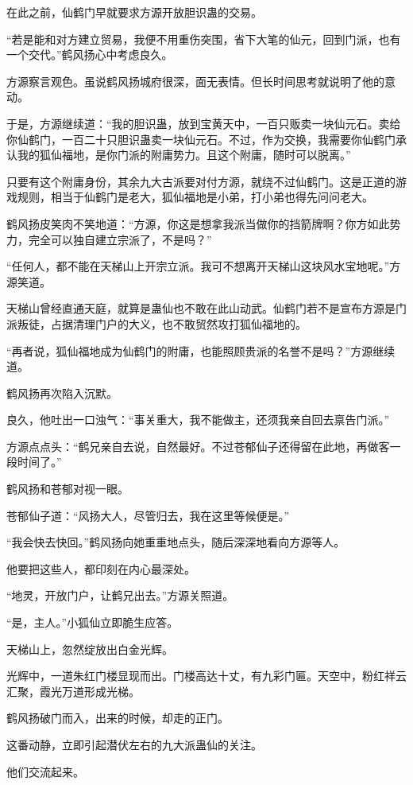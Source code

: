 \begin{this_body}
在此之前，仙鹤门早就要求方源开放胆识蛊的交易。

“若是能和对方建立贸易，我便不用重伤突围，省下大笔的仙元，回到门派，也有一个交代。”鹤风扬心中考虑良久。

方源察言观色。虽说鹤风扬城府很深，面无表情。但长时间思考就说明了他的意动。

于是，方源继续道：“我的胆识蛊，放到宝黄天中，一百只贩卖一块仙元石。卖给你仙鹤门，一百二十只胆识蛊卖一块仙元石。不过，作为交换，我需要你仙鹤门承认我的狐仙福地，是你门派的附庸势力。且这个附庸，随时可以脱离。”

只要有这个附庸身份，其余九大古派要对付方源，就绕不过仙鹤门。这是正道的游戏规则，相当于仙鹤门是老大，狐仙福地是小弟，打小弟也得先问问老大。

鹤风扬皮笑肉不笑地道：“方源，你这是想拿我派当做你的挡箭牌啊？你方如此势力，完全可以独自建立宗派了，不是吗？”

“任何人，都不能在天梯山上开宗立派。我可不想离开天梯山这块风水宝地呢。”方源笑道。

天梯山曾经直通天庭，就算是蛊仙也不敢在此山动武。仙鹤门若不是宣布方源是门派叛徒，占据清理门户的大义，也不敢贸然攻打狐仙福地的。

“再者说，狐仙福地成为仙鹤门的附庸，也能照顾贵派的名誉不是吗？”方源继续道。

鹤风扬再次陷入沉默。

良久，他吐出一口浊气：“事关重大，我不能做主，还须我亲自回去禀告门派。”

方源点点头：“鹤兄亲自去说，自然最好。不过苍郁仙子还得留在此地，再做客一段时间了。”

鹤风扬和苍郁对视一眼。

苍郁仙子道：“风扬大人，尽管归去，我在这里等候便是。”

“我会快去快回。”鹤风扬向她重重地点头，随后深深地看向方源等人。

他要把这些人，都印刻在内心最深处。

“地灵，开放门户，让鹤兄出去。”方源关照道。

“是，主人。”小狐仙立即脆生应答。

天梯山上，忽然绽放出白金光辉。

光辉中，一道朱红门楼显现而出。门楼高达十丈，有九彩门匾。天空中，粉红祥云汇聚，霞光万道形成光梯。

鹤风扬破门而入，出来的时候，却走的正门。

这番动静，立即引起潜伏左右的九大派蛊仙的关注。

他们交流起来。


\end{this_body}
